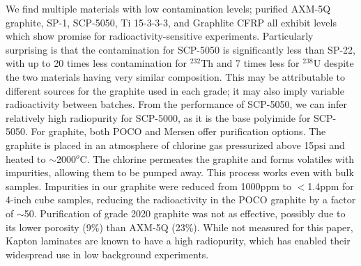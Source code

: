 \documentclass[final]{svjour2}
\begin{document}
We find multiple materials with low contamination levels; purified AXM-5Q graphite, SP-1, SCP-5050, Ti 15-3-3-3, and Graphlite CFRP all exhibit levels which show promise for radioactivity-sensitive experiments. Particularly surprising is that the contamination for SCP-5050 is significantly less than SP-22, with up to 20 times less contamination for $^{232}$Th and 7 times less for $^{238}$U despite the two materials having very similar composition. This may be attributable to different sources for the graphite used in each grade; it may also imply variable radioactivity between batches. From the performance of SCP-5050, we can infer relatively high radiopurity for SCP-5000, as it is the base polyimide for SCP-5050. For graphite, both POCO and Mersen offer purification options. The graphite is placed in an atmosphere of chlorine gas pressurized above 15psi and heated to $\sim$2000$^o$C. The chlorine permeates the graphite and forms volatiles with impurities, allowing them to be pumped away. This process works even with bulk samples. Impurities in our graphite were reduced from 1000ppm to $<$1.4ppm for 4-inch cube samples, reducing the radioactivity in the POCO graphite by a factor of $\sim$50. Purification of grade 2020 graphite was not as effective, possibly due to its lower porosity (9\%) than AXM-5Q (23\%). While not measured for this paper, Kapton laminates are known to have a high radiopurity, which has enabled their widespread use in low background experiments.
\end{document}
